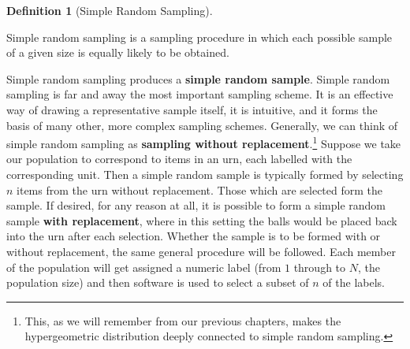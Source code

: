 \documentclass[
  letterpaper,
  DIV=11,
  numbers=noendperiod]{scrreprt}
\theoremstyle{definition}
\theoremstyle{definition}
\theoremstyle{definition}
\newtheorem{definition}{Definition}[chapter]
\theoremstyle{remark}
\begin{document}
\begin{definition}[Simple Random
Sampling]\protect\hypertarget{def-simple-random-sampling}{}\label{def-simple-random-sampling}

Simple random sampling is a sampling procedure in which each possible
sample of a given size is equally likely to be obtained.

\end{definition}

Simple random sampling produces a \textbf{simple random sample}. Simple
random sampling is far and away the most important sampling scheme. It
is an effective way of drawing a representative sample itself, it is
intuitive, and it forms the basis of many other, more complex sampling
schemes. Generally, we can think of simple random sampling as
\textbf{sampling without replacement}.\footnote{This, as we will
  remember from our previous chapters, makes the hypergeometric
  distribution deeply connected to simple random sampling.} Suppose we
take our population to correspond to items in an urn, each labelled with
the corresponding unit. Then a simple random sample is typically formed
by selecting \(n\) items from the urn without replacement. Those which
are selected form the sample. If desired, for any reason at all, it is
possible to form a simple random sample \textbf{with replacement}, where
in this setting the balls would be placed back into the urn after each
selection. Whether the sample is to be formed with or without
replacement, the same general procedure will be followed. Each member of
the population will get assigned a numeric label (from \(1\) through to
\(N\), the population size) and then software is used to select a subset
of \(n\) of the labels.
\end{document}
